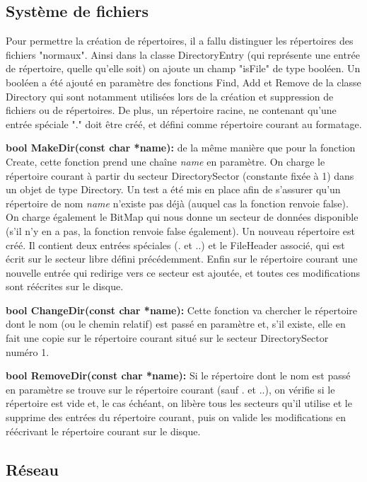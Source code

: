 \documentclass[12pt]{report}
\begin{document}
\subsection{Système de fichiers}

\bigskip
Pour permettre la création de répertoires, il a fallu distinguer les répertoires des fichiers "normaux". Ainsi dans la classe DirectoryEntry (qui représente une entrée de répertoire, quelle qu'elle soit) on ajoute un champ "isFile" de type booléen. Un booléen a été ajouté en paramètre des fonctions Find, Add et Remove de la classe Directory qui sont notamment utilisées lors de la création et suppression de fichiers ou de répertoires.
De plus, un répertoire racine, ne contenant qu'une entrée spéciale "." doit être créé, et défini comme répertoire courant au formatage.
\bigskip


\textbf{bool MakeDir(const char *name):} de la même manière que pour la fonction Create, cette fonction prend une chaîne \textit{name} en paramètre. On charge le répertoire courant à partir du secteur DirectorySector (constante fixée à 1) dans un objet de type Directory. Un test a été mis en place afin de  s'assurer qu'un répertoire de nom \textit{name} n'existe pas déjà (auquel cas la fonction renvoie false). On charge également le BitMap qui nous donne un secteur de données disponible (s'il n'y en a pas, la fonction renvoie false également). 
Un nouveau répertoire est créé. Il contient deux entrées spéciales (. et ..) et le FileHeader associé, qui est écrit sur le secteur libre défini précédemment. Enfin sur le répertoire courant une nouvelle entrée qui redirige vers ce secteur est ajoutée, et toutes ces modifications sont réécrites sur le disque.
\bigskip


\textbf{bool ChangeDir(const char *name):} Cette fonction va chercher le répertoire dont le nom (ou le chemin relatif) est passé en paramètre et, s'il existe, elle en fait une copie sur le répertoire courant situé sur le secteur DirectorySector numéro 1.
\bigskip


\textbf{bool RemoveDir(const char *name):} Si le répertoire dont le nom est passé en paramètre se trouve sur le répertoire courant (sauf . et ..), on vérifie si le répertoire est vide et, le cas échéant, on libère tous les secteurs qu'il utilise et le supprime des entrées du répertoire courant, puis on valide les modifications en réécrivant le répertoire courant sur le disque.
\newpage


\subsection{Réseau}
\end{document}
